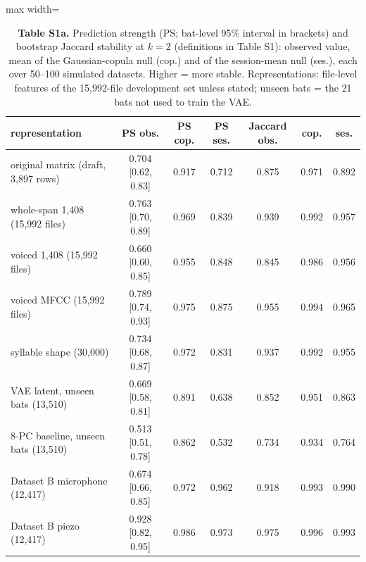 \begin{table}[htbp]\centering\scriptsize
\caption{\textbf{Table S1a.} Prediction strength (PS; bat-level 95\% interval in brackets) and bootstrap Jaccard stability at $k=2$ (definitions in Table S1): observed value, mean of the Gaussian-copula null (cop.) and of the session-mean null (ses.), each over 50--100 simulated datasets. Higher = more stable. Representations: file-level features of the 15,992-file development set unless stated; unseen bats = the 21 bats not used to train the VAE.}\label{tab:S1a}
\begin{adjustbox}{max width=\linewidth}
\begin{tabular}{lcccccc}
\toprule
representation & PS obs. & PS cop. & PS ses. & Jaccard obs. & cop. & ses. \\
\midrule
original matrix (draft, 3,897 rows) & 0.704 [0.62, 0.83] & 0.917 & 0.712 & 0.875 & 0.971 & 0.892 \\
whole-span 1,408 (15,992 files) & 0.763 [0.70, 0.89] & 0.969 & 0.839 & 0.939 & 0.992 & 0.957 \\
voiced 1,408 (15,992 files) & 0.660 [0.60, 0.85] & 0.955 & 0.848 & 0.845 & 0.986 & 0.956 \\
voiced MFCC (15,992 files) & 0.789 [0.74, 0.93] & 0.975 & 0.875 & 0.955 & 0.994 & 0.965 \\
syllable shape (30,000) & 0.734 [0.68, 0.87] & 0.972 & 0.831 & 0.937 & 0.992 & 0.955 \\
VAE latent, unseen bats (13,510) & 0.669 [0.58, 0.81] & 0.891 & 0.638 & 0.852 & 0.951 & 0.863 \\
8-PC baseline, unseen bats (13,510) & 0.513 [0.51, 0.78] & 0.862 & 0.532 & 0.734 & 0.934 & 0.764 \\
Dataset B microphone (12,417) & 0.674 [0.66, 0.85] & 0.972 & 0.962 & 0.918 & 0.993 & 0.990 \\
Dataset B piezo (12,417) & 0.928 [0.82, 0.95] & 0.986 & 0.973 & 0.975 & 0.996 & 0.993 \\
\bottomrule
\end{tabular}
\end{adjustbox}
\end{table}
